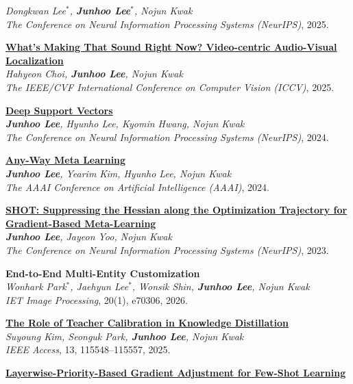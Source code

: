 \documentclass[10pt, letterpaper]{article}
\newcommand{\myname}{\textbf{\textup{Junhoo Lee}}}
\newcommand{\pubid}[1]{\textbf{[#1]}}
\newenvironment{publicationlist}{
    \begin{description}[leftmargin=4.0em, labelwidth=3.2em, labelsep=0.6em, itemsep=0.85mm, topsep=0.5mm, style=multiline, font=\normalfont]
}{
    \end{description}
}
\begin{document}
{\begin{publicationlist}
    \textit{Dongkwan Lee$^*$, \textbf{Junhoo Lee}$^*$, Nojun Kwak} \\
    \textit{The Conference on Neural Information Processing Systems (NeurIPS)}, 2025.
    \item[\pubid{C7}] \textbf{\href{https://arxiv.org/abs/2507.04667}{What's Making That Sound Right Now? Video-centric Audio-Visual Localization}} \\
    \textit{Hahyeon Choi, \myname, Nojun Kwak} \\
    \textit{The IEEE/CVF International Conference on Computer Vision (ICCV)}, 2025.
    \item[\pubid{C8}] \textbf{\href{https://arxiv.org/abs/2403.17329}{Deep Support Vectors}} \\
    \textit{\myname, Hyunho Lee, Kyomin Hwang, Nojun Kwak} \\
    \textit{The Conference on Neural Information Processing Systems (NeurIPS)}, 2024.
    \item[\pubid{C9}] \textbf{\href{https://arxiv.org/abs/2401.05097}{Any-Way Meta Learning}} \\
    \textit{\myname, Yearim Kim, Hyunho Lee, Nojun Kwak} \\
    \textit{The AAAI Conference on Artificial Intelligence (AAAI)}, 2024.
    \item[\pubid{C10}] \textbf{\href{https://arxiv.org/abs/2310.02751}{SHOT: Suppressing the Hessian along the Optimization Trajectory for Gradient-Based Meta-Learning}} \\
    \textit{\myname, Jayeon Yoo, Nojun Kwak} \\
    \textit{The Conference on Neural Information Processing Systems (NeurIPS)}, 2023.
    \item[\pubid{J1}] \textbf{End-to-End Multi-Entity Customization} \\
    \textit{Wonhark Park$^*$, Jaehyun Lee$^*$, Wonsik Shin, \myname, Nojun Kwak} \\
    \textit{IET Image Processing}, 20(1), e70306, 2026.
    \item[\pubid{J2}] \textbf{\href{https://arxiv.org/abs/2508.20224}{The Role of Teacher Calibration in Knowledge Distillation}} \\
    \textit{Suyoung Kim, Seonguk Park, \myname, Nojun Kwak} \\
    \textit{IEEE Access}, 13, 115548--115557, 2025.
    \item[\pubid{J3}] \textbf{\href{https://doi.org/10.1016/j.eswa.2025.127053}{Layerwise-Priority-Based Gradient Adjustment for Few-Shot Learning}} \\

\end{publicationlist}}
\end{document}
